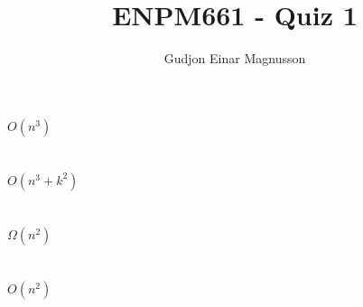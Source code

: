 \documentclass[12pt]{article}
\begin{document}
\title{ENPM661 - Quiz 1}
\author{Gudjon Einar Magnusson}

\maketitle

\section{} %

$O(n^3)$

\section{} %

$O(n^3+k^2)$

\section{} %

$\Omega(n^2)$

\section{} %

$O(n^2)$
\end{document}
